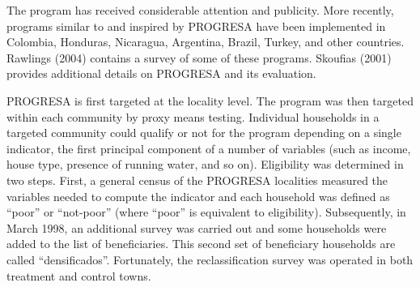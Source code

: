 \documentclass{handoutForSolutions}
\begin{document}
The program has received considerable attention and publicity. More recently, programs similar to and inspired by PROGRESA have been implemented in Colombia, Honduras, Nicaragua, Argentina, Brazil, Turkey, and other countries. Rawlings (2004) contains a survey of some of these programs. Skoufias (2001) provides additional details on PROGRESA and its evaluation.

PROGRESA is first targeted at the locality level. The program was then targeted within each community by proxy means testing. Individual households in a targeted community could qualify or not for the program depending on a single indicator, the first principal component of a number of variables (such as income, house type, presence of running water, and so on). Eligibility was determined in two steps. First, a general census of the PROGRESA localities measured the variables needed to compute the indicator and each household was defined as “poor” or “not-poor” (where “poor” is equivalent to eligibility). Subsequently, in March 1998, an additional survey was carried out and some households were added to the list of beneficiaries. This second set of beneficiary households are called “densificados”. Fortunately, the reclassification survey was operated in both treatment and control towns.
\end{document}
